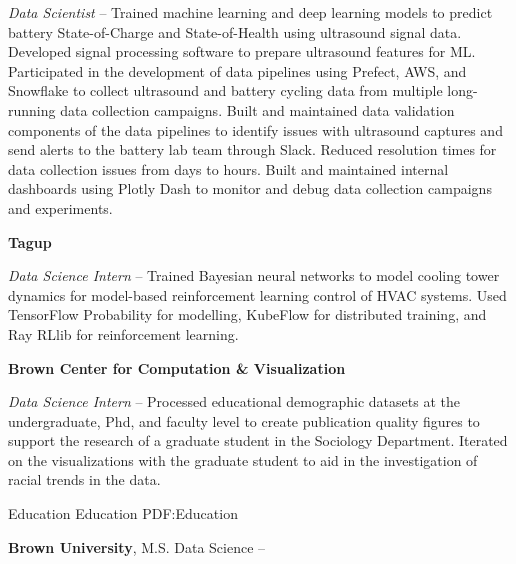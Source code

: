 \documentclass[letterpaper,MMMyyyy,nonstopmode]{simpleresumecv}
\begin{document}
\begin{Body}
\BulletItem \textit{Data Scientist}
\hfill
{} -- 
\SubBulletItem
Trained machine learning and deep learning models to predict battery State-of-Charge and State-of-Health using ultrasound signal data. Developed signal processing software to prepare ultrasound features for ML.
\SubBulletItem
Participated in the development of data pipelines using Prefect, AWS, and Snowflake to collect ultrasound and battery cycling data from multiple long-running data collection campaigns.
\SubBulletItem
Built and maintained data validation components of the data pipelines to identify issues with ultrasound captures and send alerts to the battery lab team through Slack. Reduced resolution times for data collection issues from days to hours.
\SubBulletItem
Built and maintained internal dashboards using Plotly Dash to monitor and debug data collection campaigns and experiments.

\BigGap

\Entry \textbf{Tagup}

\Gap

\BulletItem \textit{Data Science Intern}
\hfill
{} -- 
\SubBulletItem
Trained Bayesian neural networks to model cooling tower dynamics for model-based reinforcement learning control of HVAC systems. Used TensorFlow Probability for modelling, KubeFlow for distributed training, and Ray RLlib for reinforcement learning.

\BigGap

\Entry \textbf{Brown Center for Computation \& Visualization}

\Gap
  
\BulletItem \textit{Data Science Intern}
\hfill
{} -- 
\SubBulletItem
Processed educational demographic datasets at the undergraduate, Phd, and faculty level to create publication quality figures to support the research of a graduate student in the Sociology Department. Iterated on the visualizations with the graduate student to aid in the investigation of racial trends in the data.

\Section
{Education}
{Education}
{PDF:Education}

\Entry
\textbf{Brown University},
M.S. Data Science
\hfill
{} -- 



\end{Body}
\end{document}
